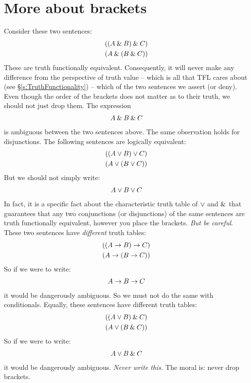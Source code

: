 \section{More about brackets}\label{s:MoreBracketingConventions}
Consider these two sentences:
	\begin{align*}
		((A \mathbin{\&} B) \mathbin{\&} C)\\
		(A \mathbin{\&} (B \mathbin{\&} C))
	\end{align*}
These are truth functionally equivalent. Consequently, it will never make any difference from the perspective of truth value -- which is all that TFL cares about (see \S\ref{s:TruthFunctionality}) -- which of the two sentences we assert (or deny). Even though the order of the brackets does not matter as to their truth, we should not just drop them. The expression
	\begin{align*}
		A \mathbin{\&} B \mathbin{\&} C
	\end{align*}
is ambiguous between the two sentences above.  The same observation holds for disjunctions. The following sentences are logically equivalent:
	\begin{align*}
		((A \vee B) \vee C)\\
		(A \vee (B \vee C))
	\end{align*}
But we should not simply write:
	\begin{align*}
		A \vee B \vee C
	\end{align*}
In fact, it is a specific fact about the characteristic truth table of $\vee$ and $\mathbin{\&}$ that guarantees that any two conjunctions (or disjunctions) of the same sentences are truth functionally equivalent, however you place the brackets. \emph{But be careful}. These two sentences have \emph{different} truth tables:
	\begin{align*}
		((A \rightarrow B) \rightarrow C)\\
		(A \rightarrow (B \rightarrow C))
	\end{align*}
So if we were to write:
	\begin{align*}
		A \rightarrow B \rightarrow C
	\end{align*}
it would be dangerously ambiguous. So we must not do the same with conditionals. Equally, these sentences have different truth tables:
	\begin{align*}
		((A \vee B) \mathbin{\&} C)\\
		(A \vee (B \mathbin{\&} C))
	\end{align*}
So if we were to write:
	\begin{align*}
		A \vee B \mathbin{\&} C
	\end{align*}
it would be dangerously ambiguous. \emph{Never write this.} The moral is: never drop brackets.

